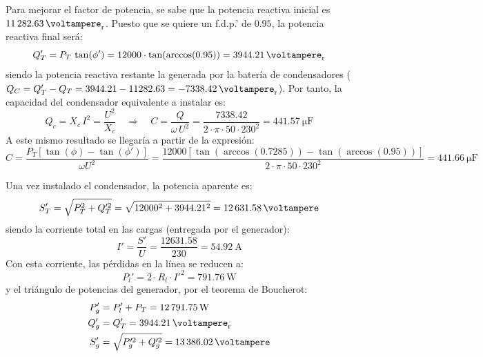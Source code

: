 Para mejorar el factor de potencia, se sabe que la potencia reactiva inicial es $\qty{11282.63}{\voltampere_r}$. Puesto que se quiere un f.d.p.' de $0.95$, la potencia reactiva final será:
\begin{equation*}
  Q_T'=P_T\,\tan(\phi')=12000\cdot \tan(\arccos(0.95))=\qty{3944.21}{\voltampere_r}
\end{equation*} 
siendo la potencia reactiva restante la generada por la batería de condensadores ($Q_C=Q_T'-Q_T=3944.21-11282.63=\qty{-7338.42}{\voltampere_r}$). Por tanto, la capacidad del condensador equivalente a instalar es:
\begin{equation*}
  Q_c=X_c\,I^2=\dfrac{U^2}{X_c} \quad \Rightarrow \quad
  C=\dfrac{Q}{\omega\,U^2}=\dfrac{7338.42}{2\cdot\pi\cdot 50\cdot
    230^2}=\qty{441.57}{\micro\farad}
\end{equation*} 
A este mismo resultado se llegaría a partir de la expresión:
\begin{equation*}
  C=\frac{P_T \left[\tan (\phi) - \tan (\phi')\right]}{\omega
    U^2}=\dfrac{12000\left[\tan (\arccos(0.7285)) - \tan
      (\arccos(0.95))\right]}{2\cdot\pi\cdot 50\cdot 230^2}=\qty{441.66}{\micro\farad}
\end{equation*}

Una vez instalado el condensador, la potencia aparente es:
\begin{equation*}
  S_T'=\sqrt{P_T^2+Q_T'^2}=\sqrt{12000^2+3944.21^2}=\qty{12631.58}{\voltampere}
\end{equation*} 
siendo la corriente total en las cargas (entregada por el generador):
\begin{equation*}
  I'=\dfrac{S'}{U}=\dfrac{12631.58}{230}=\qty{54.92}{\ampere}
\end{equation*} 
Con esta corriente, las pérdidas en la línea se reducen a:
\begin{equation*}
  P_l'=2 \cdot R_l \cdot I'^2= \qty{791.76}{\watt}
\end{equation*} 
y el triángulo de potencias del generador, por el teorema de Boucherot:
\begin{align*}
  P_g'&=P_l'+P_T=\qty{12791.75}{\watt}\\ Q_g'&=Q_T'=\qty{3944.21}{\voltampere_r}\\
  S_g'&=\sqrt{P_g'^2+Q_g'^2}=\qty{13386.02}{\voltampere}
\end{align*}


